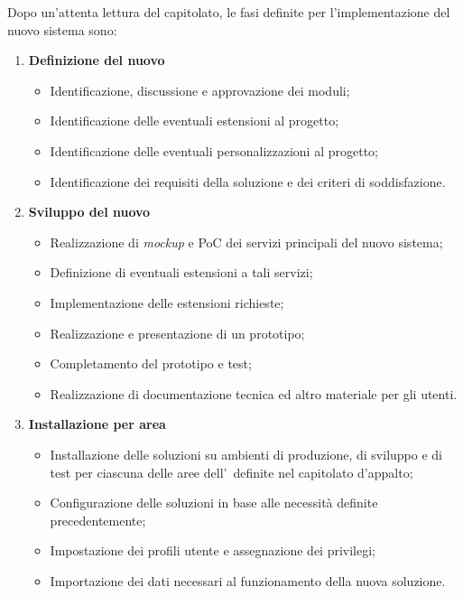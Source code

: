 	Dopo un'attenta lettura del capitolato, le fasi definite per l'implementazione del nuovo sistema sono:
	\begin{enumerate}
		\item \textbf{Definizione del nuovo \helpdesk}
			\begin{itemize}[noitemsep]
				\renewcommand\labelitemi{--}
				\item Identificazione, discussione e approvazione dei moduli;
				\item Identificazione delle eventuali estensioni al progetto;
				\item Identificazione delle eventuali personalizzazioni al progetto;
				\item Identificazione dei requisiti della soluzione e dei criteri di soddisfazione.
			\end{itemize}
			
		\item \textbf{Sviluppo del nuovo \helpdesk}
			\begin{itemize}[noitemsep]
				\renewcommand\labelitemi{--}
				\item Realizzazione di \textit{mockup} e PoC dei servizi principali del nuovo sistema;
				\item Definizione di eventuali estensioni a tali servizi;
				\item Implementazione delle estensioni richieste;
				\item Realizzazione e presentazione di un prototipo;
				\item Completamento del prototipo e test;
				\item Realizzazione di documentazione tecnica ed altro materiale per gli utenti.
			\end{itemize}
			
		\newpage
		\item \textbf{Installazione per area}
			\begin{itemize}[noitemsep]
				\renewcommand\labelitemi{--}
				\item Installazione delle soluzioni su ambienti di produzione, di sviluppo e di test per ciascuna delle aree dell'\istituto~definite nel capitolato d'appalto;
				\item Configurazione delle soluzioni in base alle necessità definite precedentemente;
				\item Impostazione dei profili utente e assegnazione dei privilegi;
				\item Importazione dei dati necessari al funzionamento della nuova soluzione.
			\end{itemize}
		

\end{enumerate}
